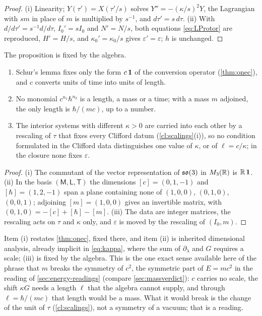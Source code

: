 \begin{proof}
(i) Linearity; $Y(\tau')=X(\tau'/s)$ solves $Y''=-(\kappa/s)^2Y$, the Lagrangian with $sm$ in place of $m$ is multiplied by $s^{-1}$, and
$d\tau'=s\,d\tau$. (ii) With $d/d\tau'=s^{-1}d/d\tau$, $I_0'=sI_0$ and $N'=N/s$, both equations \eqref{eq:LProtor} are reproduced, $H'=H/s$, and
$\kappa_0'=\kappa_0/s$ gives $\varepsilon'=\varepsilon$; $h$ is unchanged.
\end{proof}

The proposition is fixed by the algebra.

\begin{proposition}
\label{cl:noscale}
\begin{enumerate}[label=(\roman*),leftmargin=2.2em]
\item Schur's lemma \cite{Schur} fixes only the form $c\,\mathbf 1$ of the conversion operator (\cref{thm:onec}), and $c$ converts units of time into
units of length.
\item No monomial $c^{n_1}\hbar^{n_2}$ is a length, a mass or a time; with a mass $m$ adjoined, the only length is $\hbar/(mc)$, up to a number.
\item The interior systems with different $\kappa>0$ are carried into each other by a rescaling of $\tau$ that fixes every Clifford datum
(\cref{cl:scalings}(i)), so no condition formulated in the Clifford data distinguishes one value of $\kappa$, or of $\ell=c/\kappa$; in the
closure none fixes $\varepsilon$.
\end{enumerate}
\end{proposition}

\begin{proof}
(i) The commutant of the vector representation of $\mathfrak{so}(3)$ in $M_3(\mathbb{R})$ is $\mathbb{R}\,\mathbf 1$. (ii) In the basis $(\mathsf M,\mathsf L,\mathsf T)$ the
dimensions $[c]=(0,1,-1)$ and $[\hbar]=(1,2,-1)$ span a plane containing none of $(1,0,0)$, $(0,1,0)$, $(0,0,1)$; adjoining $[m]=(1,0,0)$ gives
an invertible matrix, with $(0,1,0)=-[c]+[\hbar]-[m]$. (iii) The data are integer matrices, the rescaling acts on $\tau$ and $\kappa$ only, and
$\varepsilon$ is moved by the rescaling of $(I_0,m)$.
\end{proof}

Item (i) restates \cref{thm:onec}, fixed there, and item (ii) is inherited dimensional analysis, already implicit in \eqref{eq:kappa}, where the sum of $\partial_\lambda$ and $G$ requires a
scale; (iii) is fixed by the algebra. This is the one exact sense available here of the phrase that $m$ breaks the symmetry of $c^2$, the symmetric part of $E=mc^2$ in
the reading of \cref{sec:energy-readings} (compare \cref{sec:massverdict}): $c$ carries no
scale, the shift $\kappa G$ needs a length $\ell$ that the algebra cannot supply, and through $\ell=\hbar/(mc)$ that length would be a mass. What
it would break is the change of the unit of $\tau$ (\cref{cl:scalings}), not a symmetry of a vacuum; that is a reading.

